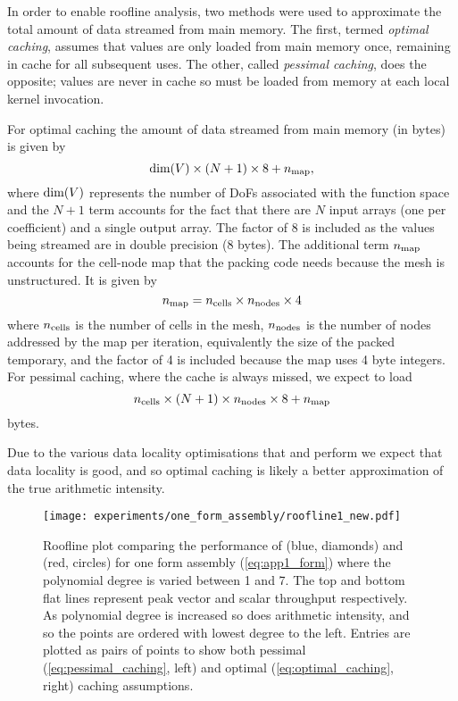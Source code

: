 \documentclass[thesis]{subfiles}
\begin{document}
In order to enable roofline analysis, two methods were used to approximate the total amount of data streamed from main memory.
The first, termed \emph{optimal caching}, assumes that values are only loaded from main memory once, remaining in cache for all subsequent uses.
The other, called \emph{pessimal caching}, does the opposite; values are never in cache so must be loaded from memory at each local kernel invocation.

For optimal caching the amount of data streamed from main memory (in bytes) is given by
\begin{equation}
  \label{eq:optimal_caching}
  \textnormal{dim}(V) \times (N + 1) \times 8 + n_{\textnormal{map}},
\end{equation}
where $\textnormal{dim}(V)$ represents the number of DoFs associated with the function space and the $N+1$ term accounts for the fact that there are $N$ input arrays (one per coefficient) and a single output array.
The factor of 8 is included as the values being streamed are in double precision (8 bytes).
The additional term $n_{\textnormal{map}}$ accounts for the cell-node map that the packing code needs because the mesh is unstructured.
It is given by
\begin{equation}
  n_{\textnormal{map}} = n_{\textnormal{cells}} \times n_{\textnormal{nodes}} \times 4
\end{equation}
where $n_{\textnormal{cells}}$ is the number of cells in the mesh, $n_{\textnormal{nodes}}$ is the number of nodes addressed by the map per iteration, equivalently the size of the packed temporary, and the factor of 4 is included because the map uses 4 byte integers.
For pessimal caching, where the cache is always missed, we expect to load
\begin{equation}
  \label{eq:pessimal_caching}
  n_{\textnormal{cells}} \times (N + 1) \times n_{\textnormal{nodes}} \times 8 + n_{\textnormal{map}}
\end{equation}
bytes.

Due to the various data locality optimisations that  and  perform we expect that data locality is good, and so optimal caching is likely a better approximation of the true arithmetic intensity.

\begin{figure}
  \centering
  \texttt{[image: experiments/one\_form\_assembly/roofline1\_new.pdf]}
  \caption{
    Roofline plot comparing the performance of  (blue, diamonds) and  (red, circles) for one form assembly (\cref{eq:app1_form}) where the polynomial degree is varied between 1 and 7.
    The top and bottom flat lines represent peak vector and scalar throughput respectively.
    As polynomial degree is increased so does arithmetic intensity, and so the points are ordered with lowest degree to the left.
    Entries are plotted as pairs of points to show both pessimal (\cref{eq:pessimal_caching}, left) and optimal (\cref{eq:optimal_caching}, right) caching assumptions.
  }
  \label{fig:app1_roofline1}
\end{figure}
\end{document}
